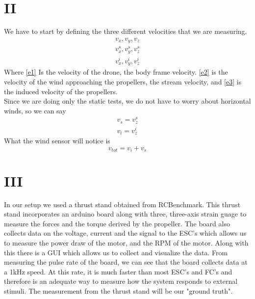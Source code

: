 \documentclass[twocolumn]{article}
\begin{document}
	\section{II}
	We have to start by defining the three different velocities that we are measuring.\\
	\begin{eqnarray}
	\label{e1}
	v_x , v_y , v_z \\
	\label{e2}
	v^s_{x} , v^s_{y} , v^s_{z} \\
	\label{e3}
	v^i_{x} , v^i_{y} , v^i_{z}
	\end{eqnarray}
	Where \ref{e1} Is the velocity of the drone, the body frame velocity. \ref{e2} is the velocity of the wind approaching the propellers, the stream velocity, and \ref{e3} is the induced velocity of the propellers.\\
	Since we are doing only the static tests, we do not have to worry about horizontal winds, so we can say 
	\begin{eqnarray}
	\nonumber
	v_s = v^s_{z}\\
	\nonumber
	v_i = v^i_{z}
	\end{eqnarray}
	What the wind sensor will notice is 
	\begin{equation}
	v_{tot} = v_{i} + v_{s}
	\label{vtot}
	\end{equation}	
	\section{III} 
	In our setup we used a thrust stand obtained from RCBenchmark. This thrust stand incorporates an arduino board along with three, three-axis strain guage to measure the forces and the torque derived by the propeller. The board also collects data on the voltage, current and the signal to the ESC's which allows us to measure the power draw of the motor, and the RPM of the motor. Along with this there is a GUI which allows us to collect and visualize the data. From measuring the pulse rate of the board, we can see that the board collects data at a 1kHz speed. At this rate, it is much faster than most ESC's and FC's and therefore is an adequate way to measure how the system responds to external stimuli. The measurement from the thrust stand will be our "ground truth".
	
\end{document}
